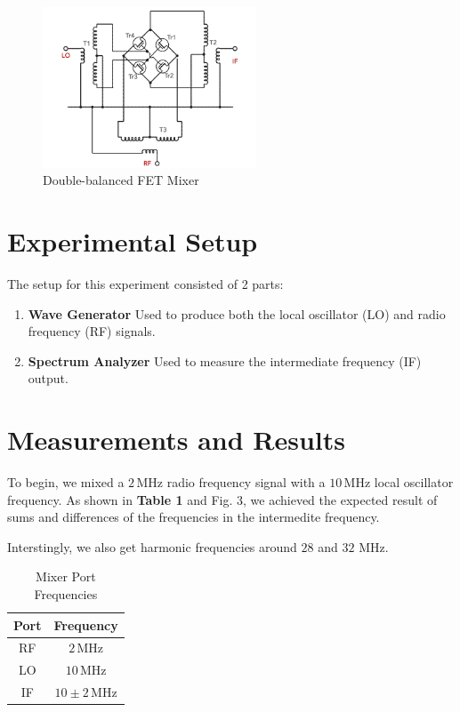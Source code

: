 \documentclass[lettersize,journal]{IEEEtran}
\begin{document}
\begin{figure}[!t]
\centering
\includegraphics[width=2.5in]{circuit}
\caption{Double-balanced FET Mixer}
\label{fig_1}
\end{figure}

\section{Experimental Setup}

The setup for this experiment consisted of 2 parts:
\begin{enumerate}
    \item {\bf{Wave Generator}} Used to produce both the local oscillator (LO) and radio frequency (RF) signals.
    \item {\bf{Spectrum Analyzer}} Used to measure the intermediate frequency (IF) output.
\end{enumerate}

\section{Measurements and Results}

To begin, we mixed a $2 \, \text{MHz}$ radio frequency signal with a $10 \, \text{MHz}$ local oscillator frequency. As shown in {\bf{Table 1}} and Fig. 3, we achieved the expected result of sums and differences of the frequencies in the intermedite frequency.

Interstingly, we also get harmonic frequencies around $28$ and $32$ MHz.

\begin{table}
\renewcommand{\arraystretch}{2.2}
\begin{center}
\caption{Mixer Port Frequencies}
\label{tab1}
\begin{tabular}{c c}
\hline
\bfseries Port & \bfseries Frequency\\
\hline
RF & $2 \, \text{MHz}$\\
\hline
LO & $10 \, \text{MHz}$\\ 
\hline
IF & $10 \pm 2 \, \text{MHz}$\\
\hline
\end{tabular}
\end{center}
\end{table}
\end{document}
